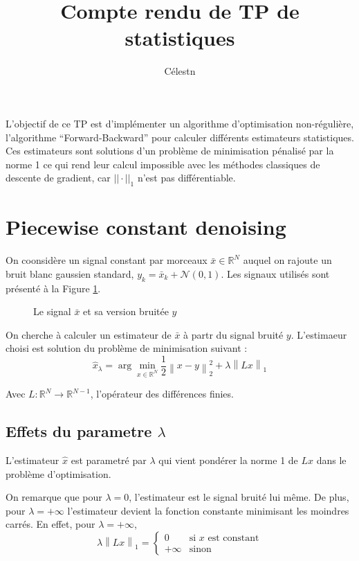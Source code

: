 \documentclass{article}
\author{Célestn \bsc{Bigarré}}
\title{Compte rendu de TP de statistiques}
\newcommand{\Rset}{\mathbb{R}}
\newcommand{\xhat}{{\hat{x}}}
\newcommand{\norm}[2][2]{\left\lVert#2\right\rVert_{#1}}
\begin{document}
\maketitle
L'objectif de ce TP est d'implémenter un algorithme d'optimisation non-régulière, l'algorithme ``Forward-Backward'' pour calculer différents estimateurs statistiques. Ces estimateurs sont solutions d'un problème de minimisation pénalisé par la norme 1 ce qui rend leur calcul impossible avec les méthodes classiques de descente de gradient, car $||\cdot||_1$ n'est pas différentiable.


\section{Piecewise constant denoising}
On coonsidère un signal constant par morceaux  $\bar x \in \Rset^N$ auquel on rajoute un bruit blanc gaussien standard,
$
y_k = \bar x_k + \mathcal{N}(0,1)
$. Les signaux utilisés sont présenté à la Figure \ref{fig:signaux}.

\begin{figure}[h]
  \centering
  
  \caption{Le signal $\bar x$ et sa version bruitée $y$}
  \label{fig:signaux}
\end{figure}

On cherche à calculer un estimateur de $\bar x$ à partr du signal bruité $y$. L'estimaeur choisi est solution du problème de minimisation suivant :
\begin{equation}
  \xhat_\lambda = \arg\min_{x \in \Rset^N } \frac{1}{2} \norm{x-y}^2 + \lambda \norm[1]{Lx} \tag{$\ast$} \label{eq:primal}
\end{equation}

Avec $L : \Rset^N \to \Rset^{N-1}$, l'opérateur des différences finies.
\subsection{Effets du parametre $\lambda$}
L'estimateur $\xhat$ est parametré par $\lambda$ qui vient pondérer la norme 1 de $Lx$ dans le problème d'optimisation.

 On remarque que pour $\lambda = 0$, l'estimateur est le signal bruité lui même. De plus, pour $\lambda = +\infty$ l'estimateur devient la fonction constante minimisant les moindres carrés. En effet, pour $\lambda = + \infty$,
\[
 \lambda\norm[1]{Lx} = \begin{cases}
   0 &\text{si $x$ est constant}\\
   +\infty&\text{sinon}
\end{cases}
\]
\end{document}
